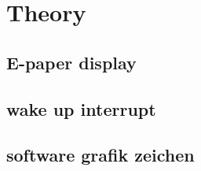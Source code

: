\chapter{Theory}

\section{E-paper display}

\section{wake up interrupt}

\section{software grafik zeichen}